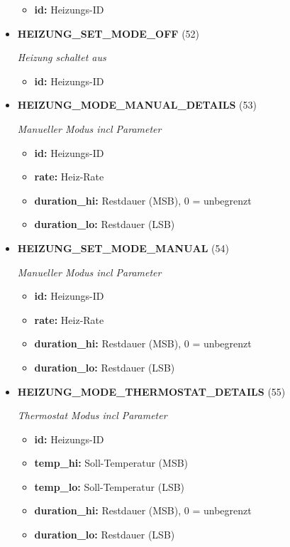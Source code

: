 \begin{itemize}
\small
\begin{itemize}
		
\item \textbf{id:} Heizungs-ID
\end{itemize}
\normalsize
	
\item \textbf{HEIZUNG\_SET\_MODE\_OFF} (52)

\textit{Heizung schaltet aus}

\small
\begin{itemize}
		
\item \textbf{id:} Heizungs-ID
\end{itemize}
\normalsize
	
\item \textbf{HEIZUNG\_MODE\_MANUAL\_DETAILS} (53)

\textit{Manueller Modus incl Parameter}

\small
\begin{itemize}
		
\item \textbf{id:} Heizungs-ID
\item \textbf{rate:} Heiz-Rate
\item \textbf{duration\_hi:} Restdauer (MSB), 0 = unbegrenzt
\item \textbf{duration\_lo:} Restdauer (LSB)
\end{itemize}
\normalsize
	
\item \textbf{HEIZUNG\_SET\_MODE\_MANUAL} (54)

\textit{Manueller Modus incl Parameter}

\small
\begin{itemize}
		
\item \textbf{id:} Heizungs-ID
\item \textbf{rate:} Heiz-Rate
\item \textbf{duration\_hi:} Restdauer (MSB), 0 = unbegrenzt
\item \textbf{duration\_lo:} Restdauer (LSB)
\end{itemize}
\normalsize
	
\item \textbf{HEIZUNG\_MODE\_THERMOSTAT\_DETAILS} (55)

\textit{Thermostat Modus incl Parameter}

\small
\begin{itemize}
		
\item \textbf{id:} Heizungs-ID
\item \textbf{temp\_hi:} Soll-Temperatur (MSB)
\item \textbf{temp\_lo:} Soll-Temperatur (LSB)
\item \textbf{duration\_hi:} Restdauer (MSB), 0 = unbegrenzt
\item \textbf{duration\_lo:} Restdauer (LSB)
\end{itemize}
\normalsize
	

\end{itemize}
